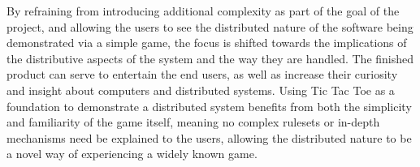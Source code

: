 \documentclass[conference]{IEEEtran}
\begin{document}
By refraining from introducing additional complexity as part of the goal of the project, and 
allowing the users to see the distributed nature of the software being demonstrated via a simple game, the focus is shifted towards the implications of the distributive aspects of the system and 
the way they are handled. The finished product can serve to entertain the end users, as well as increase their curiosity and insight about computers and distributed systems. Using Tic Tac Toe as a foundation to demonstrate a distributed system benefits from both the simplicity and familiarity of the game itself, meaning no complex rulesets or in-depth mechanisms need be explained to the users, allowing the distributed nature to be a novel way of experiencing a widely known game.

%
%


%
%
\end{document}
